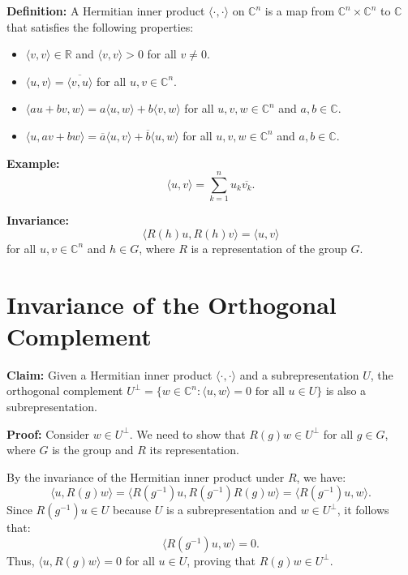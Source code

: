 \documentclass{article}
\begin{document}
\textbf{Definition:} A Hermitian inner product \( \langle \cdot, \cdot \rangle \) on \( \mathbb{C}^n \) is a map from \( \mathbb{C}^n \times \mathbb{C}^n \) to \( \mathbb{C} \) that satisfies the following properties:
\begin{itemize}
    \item \( \langle v, v \rangle \in \mathbb{R} \) and \( \langle v, v \rangle > 0 \) for all \( v \neq 0 \).
    \item \( \langle u, v \rangle = \overline{\langle v, u \rangle} \) for all \( u, v \in \mathbb{C}^n \).
    \item \( \langle a u + b v, w \rangle = a \langle u, w \rangle + b \langle v, w \rangle \) for all \( u, v, w \in \mathbb{C}^n \) and \( a, b \in \mathbb{C} \).
    \item \( \langle u, a v + b w \rangle = \overline{a} \langle u, v \rangle + \overline{b} \langle u, w \rangle \) for all \( u, v, w \in \mathbb{C}^n \) and \( a, b \in \mathbb{C} \).
\end{itemize}

\textbf{Example:}
\[
\langle u, v \rangle = \sum_{k=1}^n u_k \overline{v_k}.
\]

\textbf{Invariance:}
\[
\langle R(h) u, R(h) v \rangle = \langle u, v \rangle
\]
for all \( u, v \in \mathbb{C}^n \) and \( h \in G \), where \( R \) is a representation of the group \( G \).

\section*{Invariance of the Orthogonal Complement}

\textbf{Claim:} Given a Hermitian inner product \( \langle \cdot, \cdot \rangle \) and a subrepresentation \( U \), the orthogonal complement \( U^\perp = \{ w \in \mathbb{C}^n : \langle u, w \rangle = 0 \text{ for all } u \in U \} \) is also a subrepresentation.

\textbf{Proof:}
Consider \( w \in U^\perp \). We need to show that \( R(g)w \in U^\perp \) for all \( g \in G \), where \( G \) is the group and \( R \) its representation. 

By the invariance of the Hermitian inner product under \( R \), we have:
\[
\langle u, R(g)w \rangle = \langle R(g^{-1})u, R(g^{-1})R(g)w \rangle = \langle R(g^{-1})u, w \rangle.
\]
Since \( R(g^{-1})u \in U \) because \( U \) is a subrepresentation and \( w \in U^\perp \), it follows that:
\[
\langle R(g^{-1})u, w \rangle = 0.
\]
Thus, \( \langle u, R(g)w \rangle = 0 \) for all \( u \in U \), proving that \( R(g)w \in U^\perp \).
\end{document}
